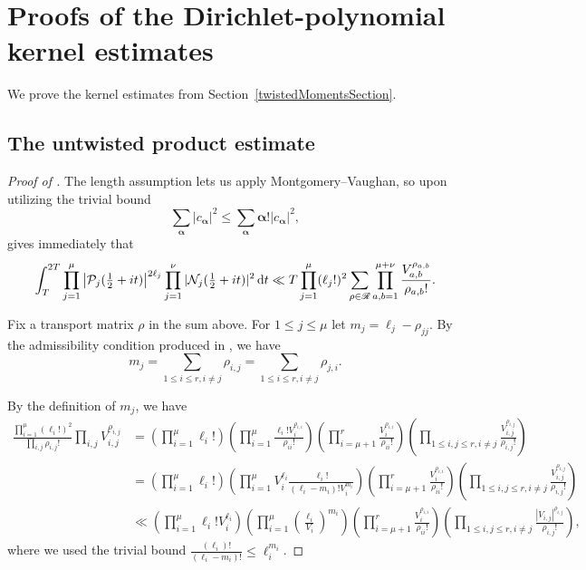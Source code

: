 \documentclass[oneside, 12pt]{amsart}
\theoremstyle{definition}
\newcommand{\dt}{\, \textup{d}t}
\begin{document}
	{\section{Proofs of the Dirichlet-polynomial kernel estimates}\label{appendixDirichletPolynomialKernels}}
	{We prove the kernel estimates from
		Section~\ref{twistedMomentsSection}.}
	{\subsection{The untwisted product estimate}}
	\begin{proof}[Proof of ]
		The length assumption lets us apply Montgomery--Vaughan, so upon utilizing the trivial bound $$\sum_{\boldsymbol{\alpha}} |c_{\boldsymbol{\alpha}}|^2 \leq \sum_{\boldsymbol{\alpha}} \boldsymbol{\alpha}!|c_{\boldsymbol{\alpha}}|^2,$$  gives {immediately} that $$\int_{T}^{2T} \prod_{j=1}^\mu \left|\mathcal{P}_j(\tfrac12+it)\right|^{2\ell_j} \prod_{j=1}^{\nu} |\mathcal{N}_j(\tfrac12+it)|^2 \dt \ll T \prod_{j=1}^{\mu} (\ell_j!)^2\sum_{\rho \in \mathscr{R}} \prod_{a,b=1}^{\mu+\nu} \frac{V_{a,b}^{\rho_{a,b}}}{\rho_{a,b}!}.$$ 
		
		Fix a transport matrix $\rho$ in the sum above. For $1\leq j \leq \mu$ let $m_j=\ell_j - \rho_{jj}$. By the admissibility condition produced in , we have
		\begin{equation}\label{mjAdmissibilityCondition}
			m_j = \sum_{1\leq i \leq r, i \neq j} \rho_{i,j} = \sum_{1\leq i \leq r, i \neq j} \rho_{j,i}.
		\end{equation}
		
		By the definition of $m_j$, we have
		\begin{align*}
			\frac{\prod_{i=1}^{\mu} (\ell_i!)^2}{\prod_{i,j} \rho_{i,j}!} \prod_{i,j} V_{i,j}^{\rho_{i,j}} &= \left(\prod_{i=1}^\mu \ell_i!\right) \left(\prod_{i=1}^\mu \frac{\ell_i!V_i^{\rho_{i,i}}}{\rho_{ii}!} \right)\left( \prod_{i=\mu+1}^r \frac{V_i^{\rho_{i,i}}}{\rho_{ii}!}\right) \left(\prod_{1\leq i,j\leq r, i\neq j} \frac{V_{i,j}^{\rho_{i,j}}}{\rho_{i,j}!}\right) \\
			&=\left(\prod_{i=1}^\mu \ell_i!\right) \left(\prod_{i=1}^{\mu} V_{i}^{\ell_i} \frac{\ell_i!}{(\ell_i-m_i)!V_i^{m_i}}\right)\left( \prod_{i=\mu+1}^r \frac{V_i^{\rho_{i,i}}}{\rho_{ii}!}\right) \left(\prod_{1\leq i,j\leq r, i\neq j} \frac{V_{i,j}^{\rho_{i,j}}}{\rho_{i,j}!}\right) \\
			&\ll  \left(\prod_{i=1}^\mu \ell_i!V_i^{\ell_i}\right) \left(\prod_{i=1}^{\mu} \left(\frac{\ell_i}{V_i}\right)^{m_i} \right) \left( \prod_{i=\mu+1}^r \frac{V_i^{\rho_{i,i}}}{\rho_{ii}!}\right) \left(\prod_{1\leq i,j\leq r, i\neq j} \frac{|V_{i,j}|^{\rho_{i,j}}}{\rho_{i,j}!}\right),
		\end{align*}
		where we used the trivial bound $\frac{(\ell_i)!}{(\ell_i-m_i)!} \leq \ell_i^{m_i}$. 
		

\end{proof}
\end{document}
